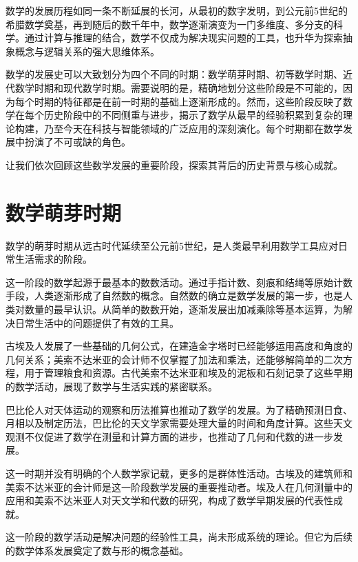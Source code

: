 数学的发展历程如同一条不断延展的长河，从最初的数字发明，到公元前5世纪的希腊数学奠基，再到随后的数千年中，数学逐渐演变为一门多维度、多分支的科学。通过计算与推理的结合，数学不仅成为解决现实问题的工具，也升华为探索抽象概念与逻辑关系的强大思维体系。

数学的发展史可以大致划分为四个不同的时期：数学萌芽时期、初等数学时期、近代数学时期和现代数学时期。需要说明的是，精确地划分这些阶段是不可能的，因为每个时期的特征都是在前一时期的基础上逐渐形成的。然而，这些阶段反映了数学在每个历史阶段中的不同侧重与进步，揭示了数学从最早的经验积累到复杂的理论构建，乃至今天在科技与智能领域的广泛应用的深刻演化。每个时期都在数学发展中扮演了不可或缺的角色。

让我们依次回顾这些数学发展的重要阶段，探索其背后的历史背景与核心成就。

\section{数学萌芽时期}
数学的萌芽时期从远古时代延续至公元前5世纪，是人类最早利用数学工具应对日常生活需求的阶段。

这一阶段的数学起源于最基本的数数活动。通过手指计数、刻痕和结绳等原始计数手段，人类逐渐形成了自然数的概念。自然数的确立是数学发展的第一步，也是人类对数量的最早认识。从简单的数数开始，逐渐发展出加减乘除等基本运算，为解决日常生活中的问题提供了有效的工具。

古埃及人发展了一些基础的几何公式，在建造金字塔时已经能够运用高度和角度的几何关系；美索不达米亚的会计师不仅掌握了加法和乘法，还能够解简单的二次方程，用于管理粮食和资源。古代美索不达米亚和埃及的泥板和石刻记录了这些早期的数学活动，展现了数学与生活实践的紧密联系。

巴比伦人对天体运动的观察和历法推算也推动了数学的发展。为了精确预测日食、月相以及制定历法，巴比伦的天文学家需要处理大量的时间和角度计算。这些天文观测不仅促进了数学在测量和计算方面的进步，也推动了几何和代数的进一步发展。

这一时期并没有明确的个人数学家记载，更多的是群体性活动。古埃及的建筑师和美索不达米亚的会计师是这一阶段数学发展的重要推动者。埃及人在几何测量中的应用和美索不达米亚人对天文学和代数的研究，构成了数学早期发展的代表性成就。

这一阶段的数学活动是解决问题的经验性工具，尚未形成系统的理论。但它为后续的数学体系发展奠定了数与形的概念基础。

